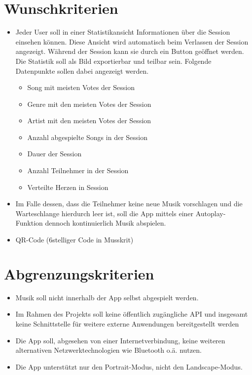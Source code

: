 \documentclass[oneside, ngerman]{sdqtechreport}
\begin{document}
\section{Wunschkriterien}
\label{sec:Zielbestimmungen:Wunschkriterien}
\begin{itemize}
    \item Jeder User soll in einer Statistikansicht Informationen über die Session einsehen können. Diese Ansicht wird automatisch beim Verlassen der Session angezeigt. Während der Session kann sie durch ein Button geöffnet werden. Die Statistik soll als Bild exportierbar und teilbar sein. 
    Folgende Datenpunkte sollen dabei angezeigt werden. 
    \begin{itemize}
        \item Song mit meisten Votes der Session
        \item Genre mit den meisten Votes der Session
        \item Artist mit den meisten Votes der Session
        \item Anzahl abgespielte Songs in der Session
        \item Dauer der Session
        \item Anzahl Teilnehmer in der Session 
        \item Verteilte Herzen in Session
    \end{itemize}
  
    \item Im Falle dessen, dass die Teilnehmer keine neue Musik vorschlagen und die Warteschlange hierdurch leer ist, soll die App mittels einer Autoplay-Funktion dennoch kontinuierlich Musik abspielen.
    \item QR-Code (6stelliger Code in Musskrit)

\end{itemize}

\section{Abgrenzungskriterien}
\label{sec:Zielbestimmungen:Abgrenzungskriterien}
\begin{itemize}
    \item Musik soll nicht innerhalb der App selbst abgespielt werden.
    \item Im Rahmen des Projekts soll keine öffentlich zugängliche API und insgesamt keine Schnittstelle für weitere externe Anwendungen bereitgestellt werden
    \item Die App soll, abgesehen von einer Internetverbindung, keine weiteren alternativen Netzwerktechnologien wie Bluetooth o.ä. nutzen.
    \item Die App unterstützt nur den Portrait-Modus, nicht den Landscape-Modus.

\end{itemize}
\end{document}
